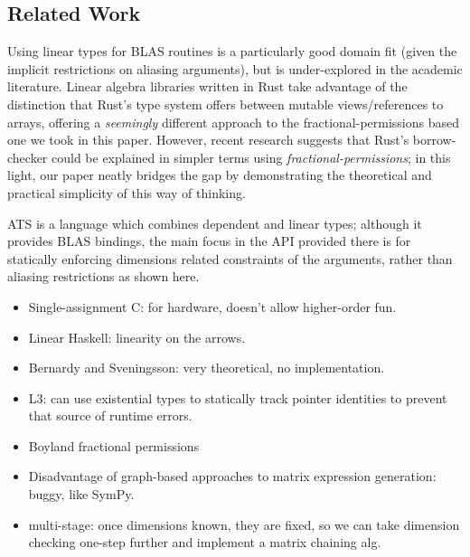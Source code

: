 \subsection{Related Work}


Using linear types for BLAS routines is a particularly good domain fit (given
the implicit restrictions on aliasing arguments), but is under-explored in the
academic literature. Linear algebra libraries written in Rust take advantage of
the distinction that Rust's type system offers between mutable views/references
to arrays, offering a \emph{seemingly} different approach to the
fractional-permissions based one we took in this paper.  However, recent
research\cite{weiss} suggests that Rust's borrow-checker could be explained in
simpler terms using \emph{fractional-permissions}; in this light, our paper
neatly bridges the gap by demonstrating the theoretical and practical
simplicity of this way of thinking.

ATS\cite{cui2005ats} is a language which combines dependent and linear types;
although it provides BLAS bindings, the main focus in the API provided there is
for statically enforcing dimensions related constraints of the arguments,
rather than aliasing restrictions as shown here.

\begin{itemize}
\item Single-assignment C: for hardware, doesn't allow higher-order fun.
\item Linear Haskell: linearity on the arrows.
\item Bernardy and Sveningsson: very theoretical, no implementation.
\item L3: can use existential types to statically track pointer identities to
    prevent that source of runtime errors.
\item Boyland fractional permissions
\item Disadvantage of graph-based approaches to matrix expression generation:
    buggy, like SymPy.
\item multi-stage: once dimensions known, they are fixed, so we can take
    dimension checking one-step further and implement a matrix chaining alg.
\end{itemize}


